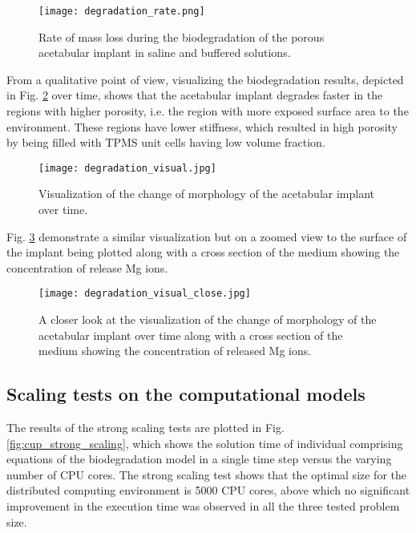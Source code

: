 \begin{figure}[h]
\centering
\medskip
\texttt{[image: degradation\_rate.png]}
\caption[Biodegradation rate for the acetabular implant]{Rate of mass loss during the biodegradation of the porous acetabular implant in saline and buffered solutions.} \label{fig:cup_degradation_rate}
\end{figure}

From a qualitative point of view, visualizing the biodegradation results, depicted in Fig. \ref{fig:cup_degradation_visual} over time, shows that the acetabular implant degrades faster in the regions with higher porosity, i.e. the region with more exposed surface area to the environment. These regions have lower stiffness, which resulted in high porosity by being filled with TPMS unit cells having low volume fraction.

\begin{figure}[h]
\centering
\medskip
\texttt{[image: degradation\_visual.jpg]}
\caption[Visualization of the change of morphology of the acetabular implant]{Visualization of the change of morphology of the acetabular implant over time.} \label{fig:cup_degradation_visual}
\end{figure}

Fig. \ref{fig:cup_degradation_visual_close} demonstrate a similar visualization but on a zoomed view to the surface of the implant being plotted along with a cross section of the medium showing the concentration of release Mg ions. 

\begin{figure}[h]
\centering
\medskip
\texttt{[image: degradation\_visual\_close.jpg]}
\caption[Visualization of the change of morphology of the acetabular implant]{A closer look at the visualization of the change of morphology of the acetabular implant over time along with a cross section of the medium showing the concentration of released Mg ions.} \label{fig:cup_degradation_visual_close}
\end{figure}

\subsection{Scaling tests on the computational models}

The results of the strong scaling tests are plotted in Fig. \ref{fig:cup_strong_scaling}, which shows the solution time of individual comprising equations of the biodegradation model in a single time step versus the varying number of CPU cores. The strong scaling test shows that the optimal size for the distributed computing environment is \num{5000} CPU cores, above which no significant improvement in the execution time was observed in all the three tested problem size.

